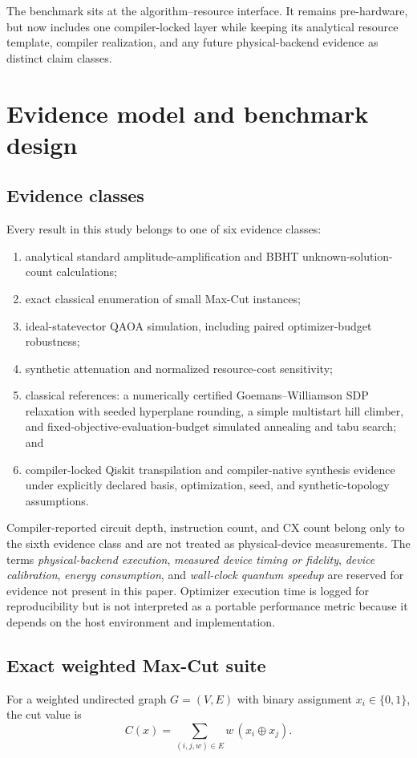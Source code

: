 \documentclass[5p,times]{elsarticle}
\begin{document}
The benchmark sits at the algorithm--resource interface. It remains pre-hardware, but now includes one compiler-locked layer while keeping its analytical resource template, compiler realization, and any future physical-backend evidence as distinct claim classes.

\section{Evidence model and benchmark design}
\subsection{Evidence classes}
Every result in this study belongs to one of six evidence classes:
\begin{enumerate}
    \item analytical standard amplitude-amplification and BBHT unknown-solution-count calculations;
    \item exact classical enumeration of small Max-Cut instances;
    \item ideal-statevector QAOA simulation, including paired optimizer-budget robustness;
    \item synthetic attenuation and normalized resource-cost sensitivity;
    \item classical references: a numerically certified Goemans--Williamson SDP relaxation with seeded hyperplane rounding, a simple multistart hill climber, and fixed-objective-evaluation-budget simulated annealing and tabu search; and
    \item compiler-locked Qiskit transpilation and compiler-native synthesis evidence under explicitly declared basis, optimization, seed, and synthetic-topology assumptions.
\end{enumerate}

Compiler-reported circuit depth, instruction count, and CX count belong only to the sixth evidence class and are not treated as physical-device measurements. The terms \emph{physical-backend execution}, \emph{measured device timing or fidelity}, \emph{device calibration}, \emph{energy consumption}, and \emph{wall-clock quantum speedup} are reserved for evidence not present in this paper. Optimizer execution time is logged for reproducibility but is not interpreted as a portable performance metric because it depends on the host environment and implementation.

\subsection{Exact weighted Max-Cut suite}
For a weighted undirected graph $G=(V,E)$ with binary assignment $x_i\in\{0,1\}$, the cut value is
\begin{equation}
C(x)=\sum_{(i,j,w)\in E} w\,(x_i\oplus x_j).
\end{equation}
\end{document}
